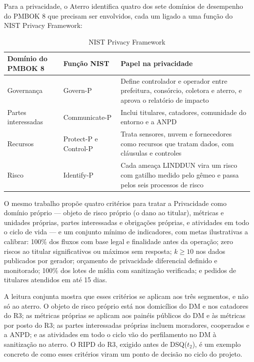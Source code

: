 \documentclass[12pt,a4paper,article,oneside,english,brazil]{abntex2}
\newcommand{\fontetab}[1]{\par\vspace{3pt}{\small\noindent Fonte: #1\par}}
\newcommand{\dsq}[1]{DSQ($t_{#1}$)}
\begin{document}
Para a privacidade, o Aterro identifica quatro dos sete domínios de desempenho do PMBOK 8 que precisam ser envolvidos, cada um ligado a uma função do NIST Privacy Framework:

\begin{table}[!htbp]
\centering
\caption{NIST Privacy Framework}
\label{tab:nist}
\small
\begin{tabularx}{\linewidth}{>{\raggedright\arraybackslash}p{3.2cm} >{\raggedright\arraybackslash}p{3cm} Y}
\hline
\textbf{Domínio do PMBOK 8} & \textbf{Função NIST} & \textbf{Papel na privacidade}\\
\hline
Governança & Govern-P & Define controlador e operador entre prefeitura, consórcio, coletora e aterro, e aprova o relatório de impacto\\
Partes interessadas & Communicate-P & Inclui titulares, catadores, comunidade do entorno e a ANPD\\
Recursos & Protect-P e Control-P & Trata sensores, nuvem e fornecedores como recursos que tratam dados, com cláusulas e controles\\
Risco & Identify-P & Cada ameaça LINDDUN vira um risco com gatilho medido pelo gêmeo e passa pelos seis processos de risco\\
\hline
\end{tabularx}
\fontetab{Elaborado pelo autor (2026).}
\end{table}

O mesmo trabalho propõe quatro critérios para tratar a Privacidade como domínio próprio --- objeto de risco próprio (o dano ao titular), métricas e unidades próprias, partes interessadas e obrigações próprias, e atividades em todo o ciclo de vida --- e um conjunto mínimo de indicadores, com metas ilustrativas a calibrar: 100\% dos fluxos com base legal e finalidade antes da operação; zero riscos ao titular significativos ou máximos sem resposta; $k \geq 10$ nos dados publicados por gerador; orçamento de privacidade diferencial definido e monitorado; 100\% dos lotes de mídia com sanitização verificada; e pedidos de titulares atendidos em até 15 dias.

A leitura conjunta mostra que esses critérios se aplicam aos três segmentos, e não só ao aterro. O objeto de risco próprio está nos domicílios do DM e nos catadores do R3; as métricas próprias se aplicam aos painéis públicos do DM e às métricas por posto do R3; as partes interessadas próprias incluem moradores, cooperados e a ANPD; e as atividades em todo o ciclo vão do perfilamento no DM à sanitização no aterro. O RIPD do R3, exigido antes de \dsq{2}, é um exemplo concreto de como esses critérios viram um ponto de decisão no ciclo do projeto.
\end{document}
